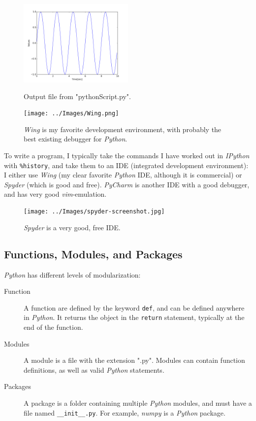 \begin{figure}
  \centering
  \includegraphics[width=0.5\textwidth]{../Images/Sinewave.png}\\
  \caption{Output file from "pythonScript.py".}
  \label{fig:pythonScript}
\end{figure}


\begin{figure}
  \centering
  \texttt{[image: ../Images/Wing.png]}\\
  \caption{\emph{Wing} is my favorite development environment, with probably the best existing debugger for \emph{Python}.}
\end{figure}

To write a program, I typically take the commands I have worked out in \emph{IPython} with \lstinline{%history}, and take them to an IDE (integrated development environment): I either use \emph{Wing} (my clear favorite \emph{Python} IDE, although it is commercial) or \emph{Spyder} (which is good and free). \emph{PyCharm} is another IDE with a good debugger, and has very good \emph{vim}-emulation.

\begin{figure}
  \centering
  \texttt{[image: ../Images/spyder-screenshot.jpg]}\\
  \caption{\emph{Spyder} is a very good, free IDE.}
\end{figure}

\subsection{Functions, Modules, and Packages}

\emph{Python} has different levels of modularization:

\begin{description}
  \item[Function] A \gls{function} are defined by the keyword \lstinline{def}, and can be defined anywhere in \emph{Python}. It returns the object in the \lstinline{return} statement, typically at the end of the function.
  \item[Modules] A \gls{module} is a file with the extension ".py". Modules can contain function definitions, as well as valid \emph{Python} statements.
  \item[Packages] A \gls{package} is a folder containing multiple \emph{Python} modules, and must have a file named \lstinline{__init__.py}. For example, \emph{numpy} is a \emph{Python} package.
\end{description}

